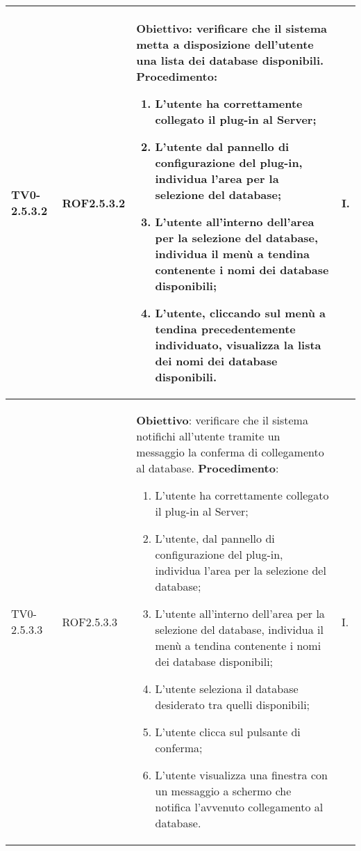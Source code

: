 \begin{longtable}{|C{.15\textwidth}|C{.13\textwidth}|m{.52\textwidth}|C{.08\textwidth}|}
TV0-2.5.3.2 & ROF2.5.3.2 &
	\textbf{Obiettivo}: verificare che il sistema metta a disposizione dell'utente una lista dei database disponibili. \newline
	\textbf{Procedimento}:
	\begin{enumerate}
		\item L'utente ha correttamente collegato il plug-in al Server;
		\item L'utente dal pannello di configurazione del plug-in, individua l'area per la selezione del database;
		\item L'utente all'interno dell'area per la selezione del database, individua il menù a tendina contenente i nomi dei database disponibili;
		\item L'utente, cliccando sul menù a tendina precedentemente individuato, visualizza la lista dei nomi dei database disponibili.	\end{enumerate} & I. \\
\hline

TV0-2.5.3.3 & ROF2.5.3.3 &
	\textbf{Obiettivo}: verificare che il sistema notifichi all'utente tramite un messaggio la conferma di collegamento al database. \newline
	\textbf{Procedimento}:
	\begin{enumerate}
		\item L'utente ha correttamente collegato il plug-in al Server;
		\item L'utente, dal pannello di configurazione del plug-in, individua l'area per la selezione del database;
		\item L'utente all'interno dell'area per la selezione del database, individua il menù a tendina contenente i nomi dei database disponibili;
		\item L'utente seleziona il database desiderato tra quelli disponibili;
		\item L'utente clicca sul pulsante di conferma;
		\item L'utente visualizza una finestra con un messaggio a schermo che notifica l'avvenuto collegamento al database.		
			\end{enumerate} & I. \\
\hline


\end{longtable}
